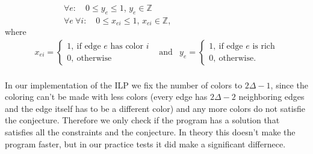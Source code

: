 \documentclass[12pt,a4paper]{amsart}
\theoremstyle{definition} %
\theoremstyle{plain} %
\newcommand{\Z}{\mathbb Z}
\begin{document}
        \ \ \ \ \ \ \ \ \ \ \ \ \ \ $\forall e: \quad 0 \leq y_{e} \leq 1$, $y_{e} \in \Z$\\

        \ \ \ \ \ \ \ \ \ \ \ \ \ \ $\forall e \ \forall i: \quad 0 \leq x_{ei} \leq 1$, $x_{ei} \in \Z$,\\

        where
        \begin{align*}        x_{ei} = \begin{cases}
                    1, \  \text{if edge $e$ has color $i$} \\
                    0, \  \text{otherwise}
            \end{cases} & \text{and} & 
            y_{e} = \begin{cases}
                1, \  \text{if edge $e$ is rich} \\
                0, \  \text{otherwise.}
            \end{cases}
        \end{align*}\\


        In our implementation of the ILP we fix the number of colors to $2 \Delta - 1$, since the coloring can't be made with less colors (every edge has $2 \Delta - 2$ neighboring edges and the edge itself has to be a different color) and any more colors do not satisfie the conjecture. Therefore we only check if the program has a solution that satisfies all the constraints and the conjecture. In theory this doesn't make the program faster, but in our practice tests it did make a significant differnece.\\
\end{document}

